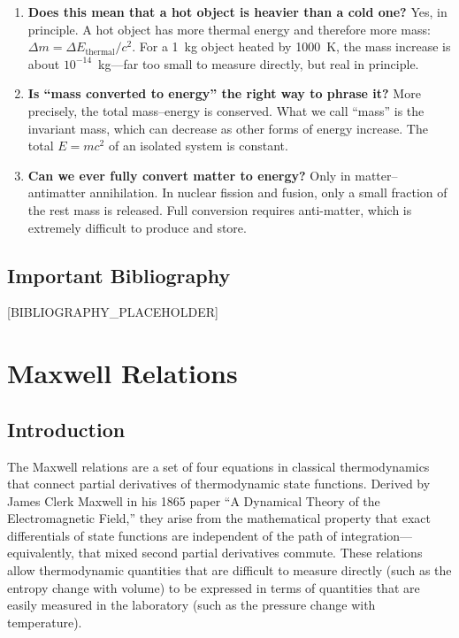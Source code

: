 \documentclass[11pt,openright]{book}
\begin{document}
\begin{enumerate}
\item \textbf{Does this mean that a hot object is heavier than a cold one?}
Yes, in principle. A hot object has more thermal energy and therefore more mass: $\Delta m = \Delta E_{\text{thermal}}/c^{2}$. For a 1~kg object heated by 1000~K, the mass increase is about $10^{-14}$~kg---far too small to measure directly, but real in principle.

\item \textbf{Is ``mass converted to energy'' the right way to phrase it?}
More precisely, the total mass--energy is conserved. What we call ``mass'' is the invariant mass, which can decrease as other forms of energy increase. The total $E = mc^{2}$ of an isolated system is constant.

\item \textbf{Can we ever fully convert matter to energy?}
Only in matter--antimatter annihilation. In nuclear fission and fusion, only a small fraction of the rest mass is released. Full conversion requires anti-matter, which is extremely difficult to produce and store.
\end{enumerate}
\section*{Important Bibliography}

[BIBLIOGRAPHY_PLACEHOLDER]


\chapter{Maxwell Relations}

\section*{Introduction}

The Maxwell relations are a set of four equations in classical thermodynamics that connect partial derivatives of thermodynamic state functions. Derived by James Clerk Maxwell in his 1865 paper ``A Dynamical Theory of the Electromagnetic Field,'' they arise from the mathematical property that exact differentials of state functions are independent of the path of integration---equivalently, that mixed second partial derivatives commute. These relations allow thermodynamic quantities that are difficult to measure directly (such as the entropy change with volume) to be expressed in terms of quantities that are easily measured in the laboratory (such as the pressure change with temperature).
\end{document}
